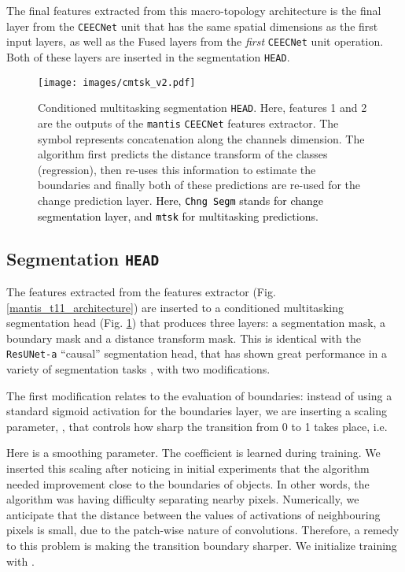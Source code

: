 \documentclass[times, 5p]{elsarticle}
\newcommand{\ceecnet}{\texttt{CEECNet}}
\begin{document}
The final features extracted from this macro-topology architecture is the final layer from the \ceecnet{} unit that has the same spatial dimensions as the first input layers, as well as the Fused layers from the \emph{first} \ceecnet{} unit operation. Both of these layers are inserted in the segmentation \texttt{HEAD}.
\begin{figure}
\centering
\texttt{[image: images/cmtsk\_v2.pdf]}
\caption{Conditioned multitasking segmentation \texttt{HEAD}. Here, features 1 and 2 are the outputs of the \texttt{mantis} \ceecnet{} features extractor. The symbol  represents concatenation along the channels dimension. The algorithm first predicts the distance transform of the classes (regression), then re-uses this information to estimate the boundaries and finally both of these predictions are re-used for the change prediction layer. \textcolor{black}{Here, \texttt{Chng Segm} stands for change segmentation layer, and \texttt{mtsk} for multitasking predictions.}}
\label{classification_HEAD}
\end{figure}
\subsection{Segmentation  \texttt{HEAD}}

The features extracted from the features extractor (Fig. \ref{mantis_t11_architecture}) are  inserted to a conditioned multitasking segmentation head (Fig. \ref{classification_HEAD}) that produces three layers: a segmentation mask, a boundary mask and a distance transform mask. This is identical with the   \texttt{ResUNet-a} ``causal'' segmentation head, that has shown great performance in a variety of segmentation tasks \citep{DIAKOGIANNIS202094,WALDNER2020111741},  with two modifications. 




The first modification relates to the evaluation of boundaries: instead of using a standard sigmoid activation for the boundaries layer, we are inserting a scaling parameter, , that controls how sharp the transition from 0 to 1 takes place, i.e. 
 
Here  is a smoothing parameter. The  coefficient is learned during training. We inserted this scaling after noticing in initial experiments that the algorithm needed improvement close to the boundaries of objects. In other words, the algorithm was having difficulty  separating nearby pixels. Numerically, we anticipate that the distance between the  values of activations of neighbouring pixels is small, due to the patch-wise nature of convolutions. Therefore, a remedy to this problem is making the transition boundary sharper.  
 We initialize training with . 
 
\end{document}
